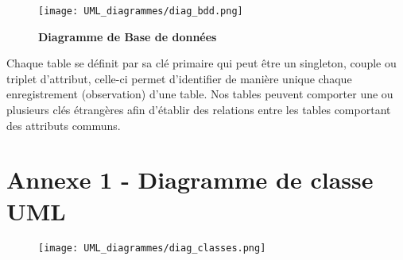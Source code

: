 \documentclass[11pt]{article}
\begin{document}
\begin{figure}[H]
    \caption{\textbf{Diagramme de Base de données}}
    \label{UML_bdd}
    \centering
    \texttt{[image: UML\_diagrammes/diag\_bdd.png]}
\end{figure}


Chaque table se définit par sa clé primaire qui peut être un singleton, couple ou triplet d'attribut, celle-ci permet d'identifier de manière unique chaque enregistrement (observation) d'une table. Nos tables peuvent comporter une ou plusieurs clés étrangères afin d'établir des relations entre les tables comportant des attributs communs.










\appendix  %
\section*{Annexe 1 - Diagramme de classe UML}

\begin{figure}[H]
    \label{UML_classes}
    \centering
    \texttt{[image: UML\_diagrammes/diag\_classes.png]}
\end{figure}



\restoregeometry
\end{document}
